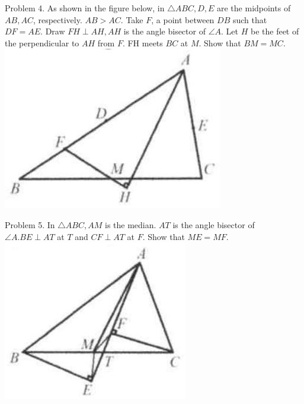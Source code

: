 \documentclass[10pt]{article}
\begin{document}
Problem 4. As shown in the figure below, in \(\triangle A B C, D, E\) are the midpoints of \(A B, A C\), respectively. \(A B>A C\). Take \(F\), a point between \(D B\) such that \(D F=A E\). Draw \(F H \perp A H, A H\) is the angle bisector of \(\angle A\). Let \(H\) be the feet of the perpendicular to \(A H\) from \(F\). FH meets \(B C\) at \(M\). Show that \(B M=M C\).\\
\includegraphics[max width=\textwidth, center]{2025_04_17_97bc1f7e44d93c271a88g-064(2)}


Problem 5. In \(\triangle A B C, A M\) is the median. \(A T\) is the angle bisector of \(\angle A . B E \perp A T\) at \(T\) and \(C F \perp A T\) at \(F\). Show that \(M E=M F\).\\
\includegraphics[max width=\textwidth, center]{2025_04_17_97bc1f7e44d93c271a88g-065(1)}
\end{document}
